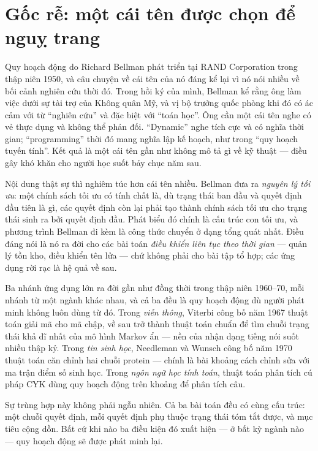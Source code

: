 \documentclass[../../algorithm.tex]{subfiles}
\begin{document}
\section{Gốc rễ: một cái tên được chọn để nguỵ trang}

Quy hoạch động do Richard Bellman phát triển tại RAND Corporation trong thập niên 1950, và câu chuyện về cái tên của nó đáng kể lại vì nó nói nhiều về bối cảnh nghiên cứu thời đó. Trong hồi ký của mình, Bellman kể rằng ông làm việc dưới sự tài trợ của Không quân Mỹ, và vị bộ trưởng quốc phòng khi đó có ác cảm với từ ``nghiên cứu'' và đặc biệt với ``toán học''. Ông cần một cái tên nghe có vẻ thực dụng và không thể phản đối. ``Dynamic'' nghe tích cực và có nghĩa thời gian; ``programming'' thời đó mang nghĩa lập kế hoạch, như trong ``quy hoạch tuyến tính''. Kết quả là một cái tên gần như không mô tả gì về kỹ thuật --- điều gây khó khăn cho người học suốt bảy chục năm sau.

Nội dung thật sự thì nghiêm túc hơn cái tên nhiều. Bellman đưa ra \emph{nguyên lý tối ưu}: một chính sách tối ưu có tính chất là, dù trạng thái ban đầu và quyết định đầu tiên là gì, các quyết định còn lại phải tạo thành chính sách tối ưu cho trạng thái sinh ra bởi quyết định đầu. Phát biểu đó chính là cấu trúc con tối ưu, và phương trình Bellman đi kèm là công thức chuyển ở dạng tổng quát nhất. Điều đáng nói là nó ra đời cho các bài toán \emph{điều khiển liên tục theo thời gian} --- quản lý tồn kho, điều khiển tên lửa --- chứ không phải cho bài tập tổ hợp; các ứng dụng rời rạc là hệ quả về sau.

Ba nhánh ứng dụng lớn ra đời gần như đồng thời trong thập niên 1960--70, mỗi nhánh từ một ngành khác nhau, và cả ba đều là quy hoạch động dù người phát minh không luôn dùng từ đó. Trong \emph{viễn thông}, Viterbi công bố năm 1967 thuật toán giải mã cho mã chập, về sau trở thành thuật toán chuẩn để tìm chuỗi trạng thái khả dĩ nhất của mô hình Markov ẩn --- nền của nhận dạng tiếng nói suốt nhiều thập kỷ. Trong \emph{tin sinh học}, Needleman và Wunsch công bố năm 1970 thuật toán căn chỉnh hai chuỗi protein --- chính là bài khoảng cách chỉnh sửa với ma trận điểm số sinh học. Trong \emph{ngôn ngữ học tính toán}, thuật toán phân tích cú pháp CYK dùng quy hoạch động trên khoảng để phân tích câu.

Sự trùng hợp này không phải ngẫu nhiên. Cả ba bài toán đều có cùng cấu trúc: một chuỗi quyết định, mỗi quyết định phụ thuộc trạng thái tóm tắt được, và mục tiêu cộng dồn. Bất cứ khi nào ba điều kiện đó xuất hiện --- ở bất kỳ ngành nào --- quy hoạch động sẽ được phát minh lại.
\end{document}
